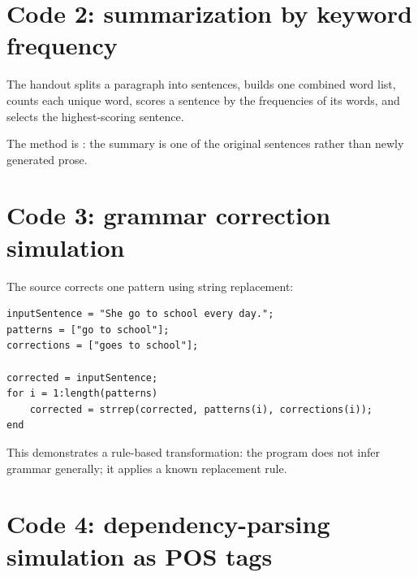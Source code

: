 \section{Code 2: summarization by keyword frequency}

The handout splits a paragraph into sentences, builds one combined word list, counts each unique word, scores a sentence by the frequencies of its words, and selects the highest-scoring sentence.

\begin{mlfigure}
\end{mlfigure}

The method is : the summary is one of the original sentences rather than newly generated prose.

\section{Code 3: grammar correction simulation}

The source corrects one pattern using string replacement:

\begin{lstlisting}[style=mlmatlab]
inputSentence = "She go to school every day.";
patterns = ["go to school"];
corrections = ["goes to school"];

corrected = inputSentence;
for i = 1:length(patterns)
    corrected = strrep(corrected, patterns(i), corrections(i));
end
\end{lstlisting}

This demonstrates a rule-based transformation: the program does not infer grammar generally; it applies a known replacement rule.

\section{Code 4: dependency-parsing simulation as POS tags}

